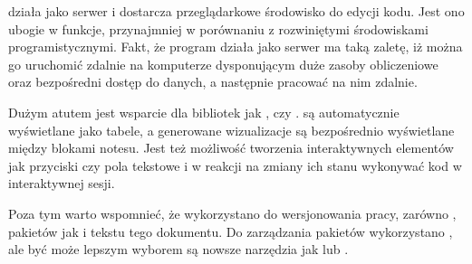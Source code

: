  działa jako serwer  i dostarcza przeglądarkowe środowisko do edycji kodu. Jest ono
ubogie w funkcje, przynajmniej w porównaniu z rozwiniętymi środowiskami programistycznymi. Fakt, że
program działa jako serwer ma taką zaletę, iż można go uruchomić zdalnie na komputerze dysponującym duże zasoby
obliczeniowe oraz bezpośredni dostęp do danych, a następnie pracować na nim zdalnie.

Dużym atutem jest wsparcie dla bibliotek jak ,  czy .
 są automatycznie wyświetlane jako tabele, a generowane wizualizacje są bezpośrednio wyświetlane
między blokami notesu. Jest też możliwość tworzenia interaktywnych elementów jak przyciski czy pola tekstowe i
w reakcji na zmiany ich stanu wykonywać kod w interaktywnej sesji.

Poza tym warto wspomnieć, że wykorzystano  do wersjonowania pracy, zarówno , pakietów jak i tekstu tego dokumentu. Do zarządzania pakietów wykorzystano , ale być może lepszym wyborem są nowsze narzędzia jak  lub .

